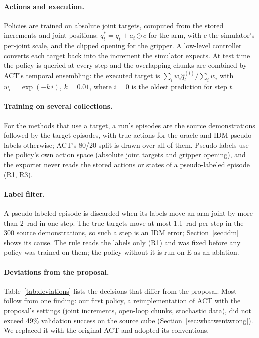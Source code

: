 \documentclass{article}
\begin{document}
\paragraph{Actions and execution.}
Policies are trained on absolute joint targets, computed from the stored increments and
joint positions: $q^{\ast}_t = q_t + a_t \odot c$ for the arm, with $c$ the simulator's
per-joint scale, and the clipped opening for the gripper. A low-level controller converts
each target back into the increment the simulator expects. At test time the policy is
queried at every step and the overlapping chunks are combined by ACT's temporal
ensembling: the executed target is $\sum_i w_i \hat{q}^{(i)}_t / \sum_i w_i$ with
$w_i = \exp(-k\,i)$, $k = 0.01$, where $i = 0$ is the oldest prediction for step $t$.

\paragraph{Training on several collections.}
For the methods that use a target, a run's episodes are the source demonstrations
followed by the target episodes, with true actions for the oracle and IDM pseudo-labels
otherwise; ACT's 80/20 split is drawn over all of them. Pseudo-labels use the policy's own
action space (absolute joint targets and gripper opening), and the exporter never reads
the stored actions or states of a pseudo-labeled episode (R1, R3).

\paragraph{Label filter.}
A pseudo-labeled episode is discarded when its labels move an arm joint by more than
2~rad in one step. The true targets move at most 1.1~rad per step in the 300 source
demonstrations, so such a step is an IDM error; Section~\ref{sec:idm} shows its cause.
The rule reads the labels only (R1) and was fixed before any policy was trained on them;
the policy without it is run on E as an ablation.

\paragraph{Deviations from the proposal.}
Table~\ref{tab:deviations} lists the decisions that differ from the proposal. Most
follow from one finding: our first policy, a reimplementation of ACT with the proposal's
settings (joint increments, open-loop chunks, stochastic data), did not exceed 49\%
validation success on the source cube (Section~\ref{sec:whatwentwrong}). We replaced it
with the original ACT and adopted its conventions.
\end{document}
